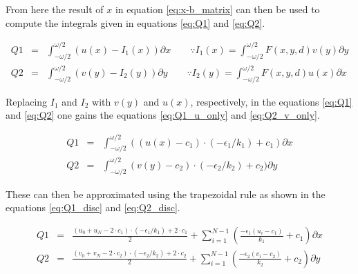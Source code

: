 \begin{landscape}
From here the result of $x$ in equation \ref{eq:x-b_matrix} can then be used to compute the integrals given in equations \ref{eq:Q1} and \ref{eq:Q2}.

\begin{eqnarray}
Q1 &=& \int ^{\omega / 2}_{-\omega /2} (u(x)-I_1(x)) \partial x \qquad \because I_1(x) = \int^{\omega/2}_{-\omega/2} F(x,y,d)v(y) \partial y \label{eq:Q1}\\
Q2 &=& \int ^{\omega / 2}_{-\omega /2} (v(y)-I_2(y)) \partial y \qquad \because I_2(y) = \int^{\omega/2}_{-\omega/2} F(x,y,d)u(x) \partial x \label{eq:Q2}
\end{eqnarray}

\end{landscape}


Replacing $I_1$ and $I_2$ with $v(y)$ and $u(x)$, respectively, in the equations \ref{eq:Q1} and \ref{eq:Q2} one gains the equations \ref{eq:Q1_u_only} and \ref{eq:Q2_v_only}.

\begin{eqnarray}
Q1 &=& \int ^{\omega / 2}_{-\omega /2} ((u(x)-c_1)\cdot(-\epsilon_1/k_1)+c_1) \partial x \label{eq:Q1_u_only}\\
Q2 &=& \int ^{\omega / 2}_{-\omega /2} (v(y)-c_2)\cdot(-\epsilon_2/k_2)+c_2) \partial y  \label{eq:Q2_v_only}
\end{eqnarray}

These can then be approximated using the trapezoidal rule as shown in the equations \ref{eq:Q1_disc} and \ref{eq:Q2_disc}.

\begin{eqnarray}
Q1 &=& \frac{(u_0 + u_N - 2 \cdot c_1)\cdot(-\epsilon_1/k_1) + 2 \cdot c_1}{2} + \sum ^{N-1}_{i = 1} \left(\frac{-\epsilon_1(u_i-c_1)}{k_1}+c_1\right) \partial x \label{eq:Q1_disc}\\
Q2 &=& \frac{(v_0 + v_N - 2 \cdot c_2)\cdot(-\epsilon_2/k_2) + 2 \cdot c_2}{2} + \sum ^{N-1}_{i = 1} \left(\frac{-\epsilon_2(v_i-c_2)}{k_2}+c_2\right) \partial y \label{eq:Q2_disc}
\end{eqnarray}



